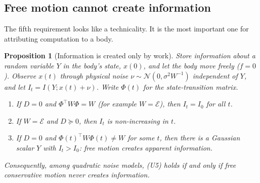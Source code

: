 \documentclass[11pt]{article}
\newtheorem{proposition}[theorem]{Proposition}
\theoremstyle{definition}
\theoremstyle{remark}
\newcommand{\Em}{\mathcal{E}}         %
\begin{document}
\subsection{Free motion cannot create information}

The fifth requirement looks like a technicality. It is the most important one for
attributing computation to a body.

\begin{proposition}[Information is created only by work]\label{prop:work}
Store information about a random variable $Y$ in the body's state, $x(0)$, and let the
body move freely ($f=0$). Observe $x(t)$ through physical noise $\nu\sim\mathcal
N(0,\sigma^2W^{-1})$ independent of $Y$, and let $I_t=I(Y;x(t)+\nu)$. Write $\Phi(t)$ for
the state-transition matrix.
\begin{enumerate}[label=(\roman*)]
  \item If $D=0$ and $\Phi^\top W\Phi=W$ (for example $W=\Em$), then $I_t=I_0$ for all
        $t$.
  \item If $W=\Em$ and $D\succeq0$, then $I_t$ is non-increasing in $t$.
  \item If $D=0$ and $\Phi(t)^\top W\Phi(t)\neq W$ for some $t$, then there is a Gaussian
        scalar $Y$ with $I_t>I_0$: free motion creates apparent information.
\end{enumerate}
Consequently, among quadratic noise models, (U5) holds \emph{if and only if} free
conservative motion never creates information.
\end{proposition}
\end{document}
